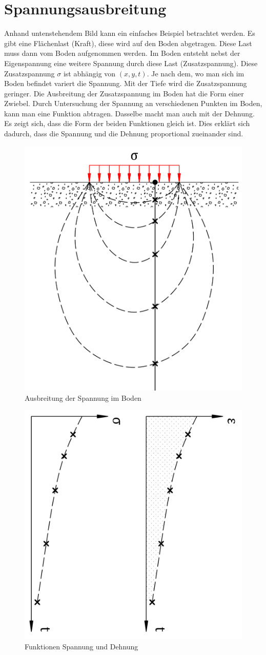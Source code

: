 \section{Spannungsausbreitung\label{spannung:section:Spannungsausbreitung}}
Anhand untenstehendem Bild kann ein einfaches Beispiel betrachtet werden.
Es gibt eine Flächenlast (Kraft), diese wird auf den Boden abgetragen.
Diese Last muss dann vom Boden aufgenommen werden.
Im Boden entsteht nebst der Eigenspannung eine weitere Spannung durch diese Last (Zusatzspannung).
Diese Zusatzspannung $\sigma$ ist abhängig von $(x,y,t)$.
Je nach dem, wo man sich im Boden befindet variert die Spannung.
Mit der Tiefe wird die Zusatzspannung geringer.
Die Ausbreitung der Zusatzspannung im Boden hat die Form einer Zwiebel.
Durch Untersuchung der Spannung an verschiedenen Punkten im Boden, kann man eine Funktion abtragen.
Dasselbe macht man auch mit der Dehnung. Es zeigt sich, dass die Form der beiden Funktionen gleich ist.
Dies erklärt sich dadurch, dass die Spannung und die Dehnung proportional zueinander sind.
\begin{figure}
	\centering
	\includegraphics[width=0.5\linewidth,keepaspectratio]{papers/spannung/Grafiken/Bild4.png}
	\caption{Ausbreitung der Spannung im Boden}
	\label{fig:Bild4}
\end{figure}

\begin{figure}
	\centering
	\includegraphics[width=0.5\linewidth,keepaspectratio]{papers/spannung/Grafiken/Bild5.png}
	\caption{Funktionen Spannung und Dehnung}
	\label{fig:Bild5}
\end{figure}

